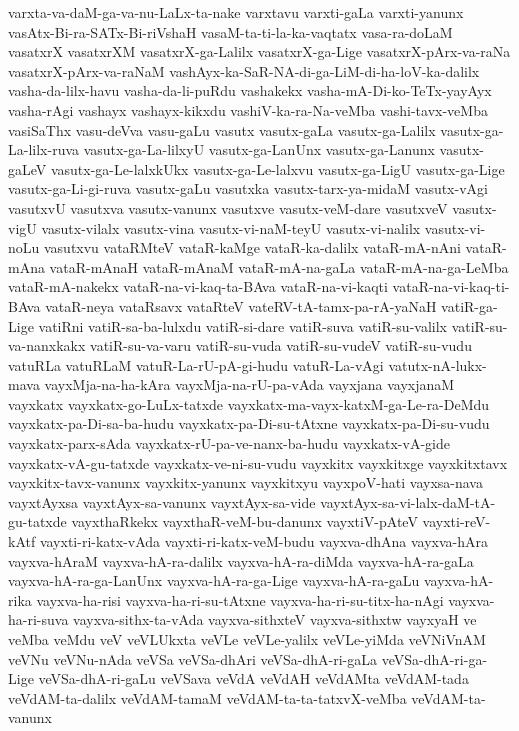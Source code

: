 {varxta-va-daM-ga-va-nu-LaLx-ta-nake
varxtavu
varxti-gaLa
varxti-yanunx
vasAtx-Bi-ra-SATx-Bi-riVshaH
vasaM-ta-ti-la-ka-vaqtatx
vasa-ra-doLaM
vasatxrX
vasatxrXM
vasatxrX-ga-Lalilx
vasatxrX-ga-Lige
vasatxrX-pArx-va-raNa
vasatxrX-pArx-va-raNaM
vashAyx-ka-SaR-NA-di-ga-LiM-di-ha-loV-ka-dalilx
vasha-da-lilx-havu
vasha-da-li-puRdu
vashakekx
vasha-mA-Di-ko-TeTx-yayAyx
vasha-rAgi
vashayx
vashayx-kikxdu
vashiV-ka-ra-Na-veMba
vashi-tavx-veMba
vasiSaThx
vasu-deVva
vasu-gaLu
vasutx
vasutx-gaLa
vasutx-ga-Lalilx
vasutx-ga-La-lilx-ruva
vasutx-ga-La-lilxyU
vasutx-ga-LanUnx
vasutx-ga-Lanunx
vasutx-gaLeV
vasutx-ga-Le-lalxkUkx
vasutx-ga-Le-lalxvu
vasutx-ga-LigU
vasutx-ga-Lige
vasutx-ga-Li-gi-ruva
vasutx-gaLu
vasutxka
vasutx-tarx-ya-midaM
vasutx-vAgi
vasutxvU
vasutxva
vasutx-vanunx
vasutxve
vasutx-veM-dare
vasutxveV
vasutx-vigU
vasutx-vilalx
vasutx-vina
vasutx-vi-naM-teyU
vasutx-vi-nalilx
vasutx-vi-noLu
vasutxvu
vataRMteV
vataR-kaMge
vataR-ka-dalilx
vataR-mA-nAni
vataR-mAna
vataR-mAnaH
vataR-mAnaM
vataR-mA-na-gaLa
vataR-mA-na-ga-LeMba
vataR-mA-nakekx
vataR-na-vi-kaq-ta-BAva
vataR-na-vi-kaqti
vataR-na-vi-kaq-ti-BAva
vataR-neya
vataRsavx
vataRteV
vateRV-tA-tamx-pa-rA-yaNaH
vatiR-ga-Lige
vatiRni
vatiR-sa-ba-lulxdu
vatiR-si-dare
vatiR-suva
vatiR-su-valilx
vatiR-su-va-nanxkakx
vatiR-su-va-varu
vatiR-su-vuda
vatiR-su-vudeV
vatiR-su-vudu
vatuRLa
vatuRLaM
vatuR-La-rU-pA-gi-hudu
vatuR-La-vAgi
vatutx-nA-lukx-mava
vayxMja-na-ha-kAra
vayxMja-na-rU-pa-vAda
vayxjana
vayxjanaM
vayxkatx
vayxkatx-go-LuLx-tatxde
vayxkatx-ma-vayx-katxM-ga-Le-ra-DeMdu
vayxkatx-pa-Di-sa-ba-hudu
vayxkatx-pa-Di-su-tAtxne
vayxkatx-pa-Di-su-vudu
vayxkatx-parx-sAda
vayxkatx-rU-pa-ve-nanx-ba-hudu
vayxkatx-vA-gide
vayxkatx-vA-gu-tatxde
vayxkatx-ve-ni-su-vudu
vayxkitx
vayxkitxge
vayxkitxtavx
vayxkitx-tavx-vanunx
vayxkitx-yanunx
vayxkitxyu
vayxpoV-hati
vayxsa-nava
vayxtAyxsa
vayxtAyx-sa-vanunx
vayxtAyx-sa-vide
vayxtAyx-sa-vi-lalx-daM-tA-gu-tatxde
vayxthaRkekx
vayxthaR-veM-bu-danunx
vayxtiV-pAteV
vayxti-reV-kAtf
vayxti-ri-katx-vAda
vayxti-ri-katx-veM-budu
vayxva-dhAna
vayxva-hAra
vayxva-hAraM
vayxva-hA-ra-dalilx
vayxva-hA-ra-diMda
vayxva-hA-ra-gaLa
vayxva-hA-ra-ga-LanUnx
vayxva-hA-ra-ga-Lige
vayxva-hA-ra-gaLu
vayxva-hA-rika
vayxva-ha-risi
vayxva-ha-ri-su-tAtxne
vayxva-ha-ri-su-titx-ha-nAgi
vayxva-ha-ri-suva
vayxva-sithx-ta-vAda
vayxva-sithxteV
vayxva-sithxtw
vayxyaH
ve
veMba
veMdu
veV
veVLUkxta
veVLe
veVLe-yalilx
veVLe-yiMda
veVNiVnAM
veVNu
veVNu-nAda
veVSa
veVSa-dhAri
veVSa-dhA-ri-gaLa
veVSa-dhA-ri-ga-Lige
veVSa-dhA-ri-gaLu
veVSava
veVdA
veVdAH
veVdAMta
veVdAM-tada
veVdAM-ta-dalilx
veVdAM-tamaM
veVdAM-ta-ta-tatxvX-veMba
veVdAM-ta-vanunx
}
